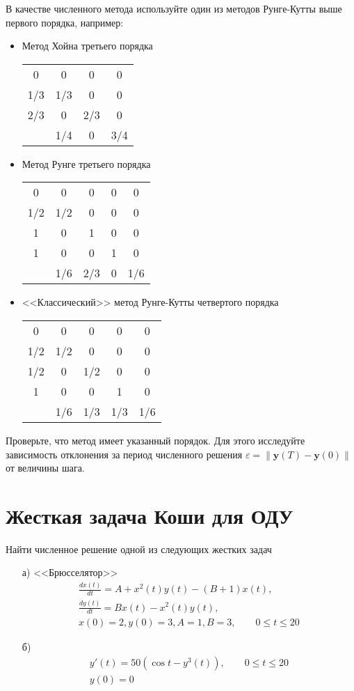 \documentclass[10pt]{article}
\begin{document}
В качестве численного метода используйте один из методов Рунге-Кутты выше
первого порядка, например:
\begin{itemize}
\item Метод Хойна третьего порядка

\begin{tabular}{c|ccc}
0 & 0 & 0 & 0\\
1/3 & 1/3 & 0 & 0\\
2/3 & 0 & 2/3 & 0\\
\hline
& 1/4 & 0 & 3/4
\end{tabular}
\item Метод Рунге третьего порядка

\begin{tabular}{c|cccc}
0 & 0 & 0 & 0 & 0\\
1/2 & 1/2 & 0 & 0 & 0\\
1 & 0 & 1 & 0 & 0\\
1 & 0 & 0 & 1 & 0\\
\hline
& 1/6 & 2/3 & 0 & 1/6
\end{tabular}
\item <<Классический>> метод Рунге-Кутты четвертого порядка

\begin{tabular}{c|cccc}
0 & 0 & 0 & 0 & 0\\
1/2 & 1/2 & 0 & 0 & 0\\
1/2 & 0 & 1/2 & 0 & 0\\
1 & 0 & 0 & 1 & 0\\
\hline
& 1/6 & 1/3 & 1/3 & 1/6
\end{tabular}

\end{itemize}

Проверьте, что метод имеет указанный порядок. Для этого исследуйте зависимость
отклонения за период численного решения 
$\varepsilon = \|\mathbf{y}(T) - \mathbf{y}(0)\|$ от величины шага.

\section{Жесткая задача Коши для ОДУ}

Найти численное решение одной из следующих жестких задач
\begin{itemize}
\item[а)] <<Брюсселятор>>
\begin{gather*}
\frac{dx(t)}{dt} = A + x^2(t) y(t) - (B + 1) x(t),\\
\frac{dy(t)}{dt} = B x(t) - x^2(t) y(t),\\
x(0) = 2, y(0) = 3, A = 1, B = 3, \qquad 0 \leq t \leq 20
\end{gather*}
\item[б)]
\begin{gather*}
y'(t) = 50 (\cos t - y^3(t)), \qquad 0 \leq t \leq 20\\
y(0) = 0
\end{gather*}
\end{itemize}
\end{document}
